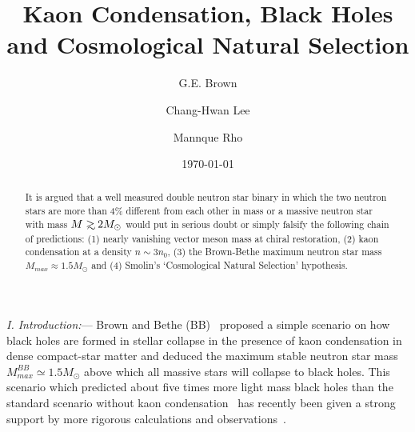 \documentclass[aps,twocolumn,preprintnumbers,%
superscriptaddress,floatfix]{revtex4}
\begin{document}
\newcommand{\be}{\begin{eqnarray}}
\newcommand{\ee}{\end{eqnarray}}
\def\lsim{\mathrel{\rlap{\lower3pt\hbox{\hskip1pt$\sim$}}
     \raise1pt\hbox{$<$}}} %
\def\gsim{\mathrel{\rlap{\lower3pt\hbox{\hskip1pt$\sim$}}
     \raise1pt\hbox{$>$}}} %
\def\N{${\cal N}\,\,$}
\def\prl{Phys. Rev. Lett.}
\def\np{Nucl. Phys.}
\def\pr{Phys. Rev.}
\def\pl{Phys. Lett.}
\def\la{\langle}\def\ra{\rangle}
\def\del{\partial}
%
\def\calL{\cal L}\def\calK{\cal K}
\def\hatn{\hat{n}}\def\Amu{{\cal A}_\mu}\def\A{{\cal A}}
\newcommand\<{\langle}
\renewcommand\>{\rangle}
\renewcommand\d{\partial}
\newcommand\LambdaQCD{\Lambda_{\textrm{QCD}}}
\newcommand\Tr{\mathrm{Tr}\,}
\newcommand\+{\dagger}
\newcommand\g{g_5}
\def\bi{\bibitem}

\newcommand{\msun}{\mbox{$M_\odot$}}
\newcommand{\rsun}{\mbox{$R_\odot$}}


\title{Kaon Condensation, Black Holes and Cosmological Natural Selection}
\author{G.E. Brown}
\author{Chang-Hwan Lee}
\author{Mannque Rho}


\begin{abstract}
It is argued that a well measured double neutron star binary in
which the two neutron stars are more than 4\% different from each
other in mass or a massive neutron star with mass $M\gsim 2\msun$
would put in serious doubt or simply falsify the following chain of
predictions: (1) nearly vanishing vector meson mass at chiral
restoration, (2) kaon condensation at a density $n\sim 3n_0$, (3)
the Brown-Bethe maximum neutron star mass $M_{max}\approx 1.5\msun$
and (4) Smolin's `Cosmological Natural Selection' hypothesis.
\end{abstract}




\date{\today}

\newcommand\sect[1]{\emph{#1}---}

\maketitle
\sect{I. Introduction:}
 Brown and Bethe (BB)~\cite{Bro94} proposed a simple scenario on how black holes are formed
in stellar collapse in the presence of kaon condensation in dense
compact-star matter and deduced the maximum stable neutron star mass
$M^{BB}_{max}\simeq 1.5\msun$ above which all massive stars will
collapse to black holes. This scenario which predicted about five
times more light mass black holes than the standard scenario without
kaon condensation~\cite{BBSN87,LPB07} has recently been given a
strong support by more rigorous calculations and
observations~\cite{BLR-kaon07}.
\end{document}
